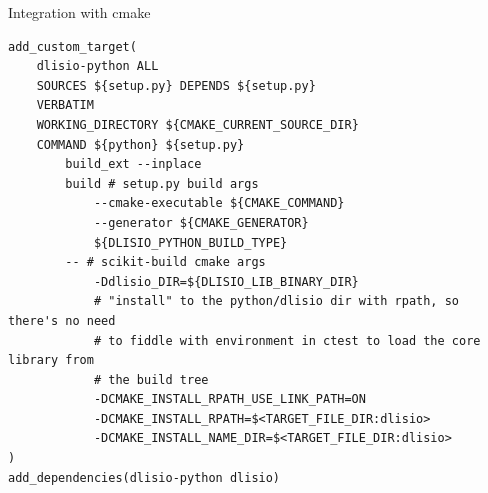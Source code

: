 \documentclass[pdf]{beamer}
\begin{document}
\begin{frame}[fragile]{Integration with cmake}

\begin{verbatim}
add_custom_target(
    dlisio-python ALL
    SOURCES ${setup.py} DEPENDS ${setup.py}
    VERBATIM
    WORKING_DIRECTORY ${CMAKE_CURRENT_SOURCE_DIR}
    COMMAND ${python} ${setup.py}
        build_ext --inplace
        build # setup.py build args
            --cmake-executable ${CMAKE_COMMAND}
            --generator ${CMAKE_GENERATOR}
            ${DLISIO_PYTHON_BUILD_TYPE}
        -- # scikit-build cmake args
            -Ddlisio_DIR=${DLISIO_LIB_BINARY_DIR}
            # "install" to the python/dlisio dir with rpath, so there's no need
            # to fiddle with environment in ctest to load the core library from
            # the build tree
            -DCMAKE_INSTALL_RPATH_USE_LINK_PATH=ON
            -DCMAKE_INSTALL_RPATH=$<TARGET_FILE_DIR:dlisio>
            -DCMAKE_INSTALL_NAME_DIR=$<TARGET_FILE_DIR:dlisio>
)
add_dependencies(dlisio-python dlisio)
\end{verbatim}

\end{frame}
\end{document}
